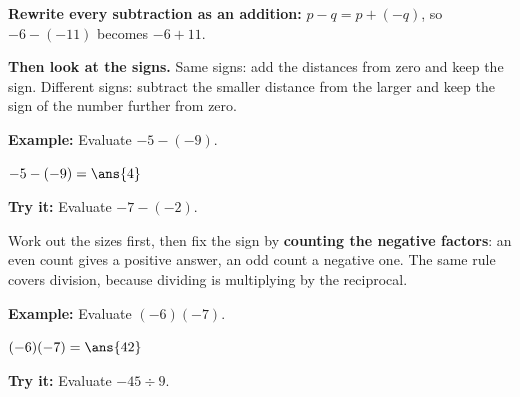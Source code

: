 \documentclass[12pt]{article}
\begin{document}


\begin{formulabox}
\textbf{Rewrite every subtraction as an addition:} $p - q = p + (-q)$, so
$-6 - (-11)$ becomes $-6 + 11$.\par
\textbf{Then look at the signs.} Same signs: add the distances from zero and
keep the sign. Different signs: subtract the smaller distance from the larger
and keep the sign of the number further from zero.
\end{formulabox}

\begin{examplebox}
\textbf{Example:} \quad Evaluate $-5 - (-9)$.

$-5 - (-9) = \ans{4}$
\end{examplebox}

\begin{tryitbox}
\textbf{Try it:} \quad Evaluate $-7 - (-2)$.\\[2pt]
\end{tryitbox}


\begin{formulabox}
Work out the sizes first, then fix the sign by \textbf{counting the negative
factors}: an even count gives a positive answer, an odd count a negative one.
The same rule covers division, because dividing is multiplying by the
reciprocal.
\end{formulabox}

\begin{examplebox}
\textbf{Example:} \quad Evaluate $(-6)(-7)$.

$(-6)(-7) = \ans{42}$
\end{examplebox}

\begin{tryitbox}
\textbf{Try it:} \quad Evaluate $-45 \div 9$.\\[2pt]
\end{tryitbox}
\end{document}
